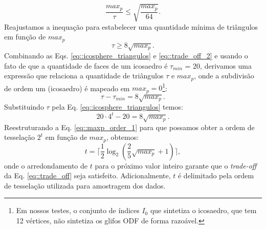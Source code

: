 \begin{equation}
\label{eq::trade_off}
    \frac{max_p}{\tau} \leq \sqrt{\frac{max_p}{64}}.
\end{equation}
Reajustamos a inequação para estabelecer uma quantidade mínima de triângulos em função de $max_p$
\begin{equation}
\label{eq::trade_off_2}
    \tau \geq 8\sqrt{max_p}
    .
\end{equation}
Combinando as Eqs. \ref{eq::icosphere_triangulos} e \ref{eq::trade_off_2} e usando o fato de que a quantidade de faces de um icosaedro é $\tau_{min}$ = 20, derivamos uma expressão que relaciona a quantidade de triângulos $\tau$ e $max_p$, onde a subdivisão de ordem um (icosaedro) é mapeado em $max_p = 0$\footnote{Em nossos testes, o conjunto de índices $I_0$ que sintetiza o icosaedro, que tem 12 vértices, não sintetiza os glifos ODF de forma razoável.}:
\begin{equation}
\label{eq::maxp_triangulo}
    \tau - \tau_{min} = 8\sqrt{max_p}.
\end{equation}
Substituindo $\tau$ pela Eq. \ref{eq::icosphere_triangulos} temos:
\begin{equation}
\label{eq::maxp_order_1}
    20 \cdot 4^t - 20 = 8\sqrt{max_p}    .
\end{equation}
Reestruturando a Eq. \ref{eq::maxp_order_1} para que possamos obter a ordem de tesselação $2^t$ em função de $max_p$, obtemos:
\begin{equation}
\label{eq::icosa_order}
     t = \lceil \frac{1}{2}\log_2{(\frac{2}{5}\sqrt{max_p} + 1)} \rceil,
\end{equation}
onde o arredondamento de $t$ para o próximo valor inteiro garante que o \textit{trade-off} da Eq. \ref{eq::trade_off} seja satisfeito. Adicionalmente, $t$ é delimitado pela ordem de tesselação utilizada para amostragem dos dados.

